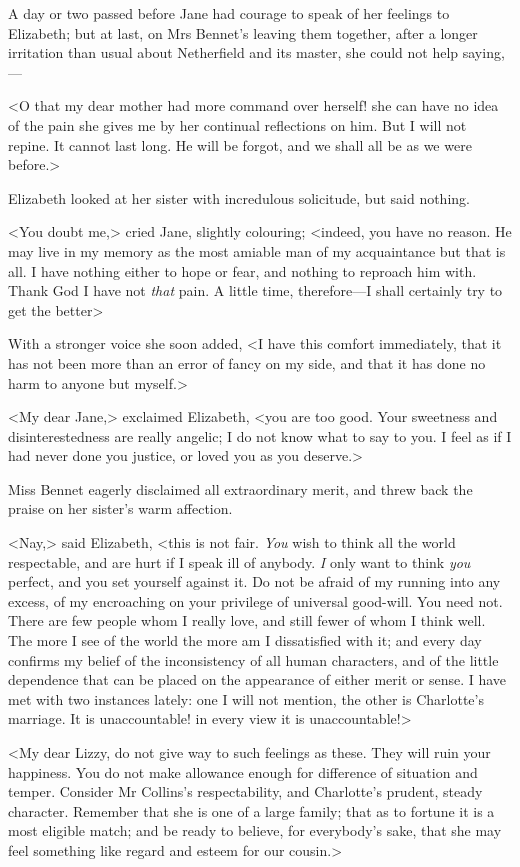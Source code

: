 A day or two passed before Jane had courage to speak of her feelings to Elizabeth; but at last, on Mrs Bennet's leaving them together, after a longer irritation than usual about Netherfield and its master, she could not help saying,—

<O that my dear mother had more command over herself! she can have no idea of the pain she gives me by her continual reflections on him. But I will not repine. It cannot last long. He will be forgot, and we shall all be as we were before.>

Elizabeth looked at her sister with incredulous solicitude, but said nothing.

<You doubt me,> cried Jane, slightly colouring; <indeed, you have no reason. He may live in my memory as the most amiable man of my acquaintance but that is all. I have nothing either to hope or fear, and nothing to reproach him with. Thank God I have not \textit{that} pain. A little time, therefore—I shall certainly try to get the better\longdash>

With a stronger voice she soon added, <I have this comfort immediately, that it has not been more than an error of fancy on my side, and that it has done no harm to anyone but myself.>

<My dear Jane,> exclaimed Elizabeth, <you are too good. Your sweetness and disinterestedness are really angelic; I do not know what to say to you. I feel as if I had never done you justice, or loved you as you deserve.>

Miss Bennet eagerly disclaimed all extraordinary merit, and threw back the praise on her sister's warm affection.

<Nay,> said Elizabeth, <this is not fair. \textit{You} wish to think all the world respectable, and are hurt if I speak ill of anybody. \textit{I} only want to think \textit{you} perfect, and you set yourself against it. Do not be afraid of my running into any excess, of my encroaching on your privilege of universal good-will. You need not. There are few people whom I really love, and still fewer of whom I think well. The more I see of the world the more am I dissatisfied with it; and every day confirms my belief of the inconsistency of all human characters, and of the little dependence that can be placed on the appearance of either merit or sense. I have met with two instances lately: one I will not mention, the other is Charlotte's marriage. It is unaccountable! in every view it is unaccountable!>

<My dear Lizzy, do not give way to such feelings as these. They will ruin your happiness. You do not make allowance enough for difference of situation and temper. Consider Mr Collins's respectability, and Charlotte's prudent, steady character. Remember that she is one of a large family; that as to fortune it is a most eligible match; and be ready to believe, for everybody's sake, that she may feel something like regard and esteem for our cousin.>

